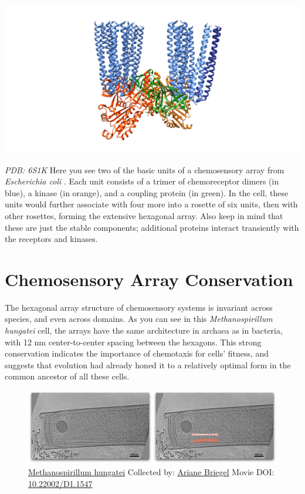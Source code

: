 \documentclass[]{tufte-book}
\begin{document}
\includegraphics{img/schematics/7_2_1}

\emph{PDB: 6S1K} Here you see two of the basic units of a chemosensory
array from \emph{Escherichia coli} \citep{cassidy2020}. Each unit
consists of a trimer of chemoreceptor dimers (in blue), a kinase (in
orange), and a coupling protein (in green). In the cell, these units
would further associate with four more into a rosette of six units, then
with other rosettes, forming the extensive hexagonal array. Also keep in
mind that these are just the stable components; additional proteins
interact transiently with the receptors and kinases.

\section{Chemosensory Array
Conservation}\label{chemosensory-array-conservation}

The hexagonal array structure of chemosensory systems is invariant
across species, and even across domains. As you can see in this
\emph{Methanospirillum hungatei} cell, the arrays have the same
architecture in archaea as in bacteria, with 12 nm center-to-center
spacing between the hexagons. This strong conservation indicates the
importance of chemotaxis for cells' fitness, and suggests that evolution
had already honed it to a relatively optimal form in the common ancestor
of all these cells.





\begin{figure}
\includegraphics{movie_stills/7_3} \caption[\protect\hyperlink{tree}{Methanospirillum hungatei} Collected
by: \protect\hyperlink{ariane_briegel}{Ariane Briegel} Movie DOI:
\href{https://doi.org/10.22002/D1.1547}{10.22002/D1.1547}]{\protect\hyperlink{tree}{Methanospirillum hungatei} Collected
by: \protect\hyperlink{ariane_briegel}{Ariane Briegel} Movie DOI:
\href{https://doi.org/10.22002/D1.1547}{10.22002/D1.1547}}\label{fig:7-3}
\end{figure}
\end{document}
